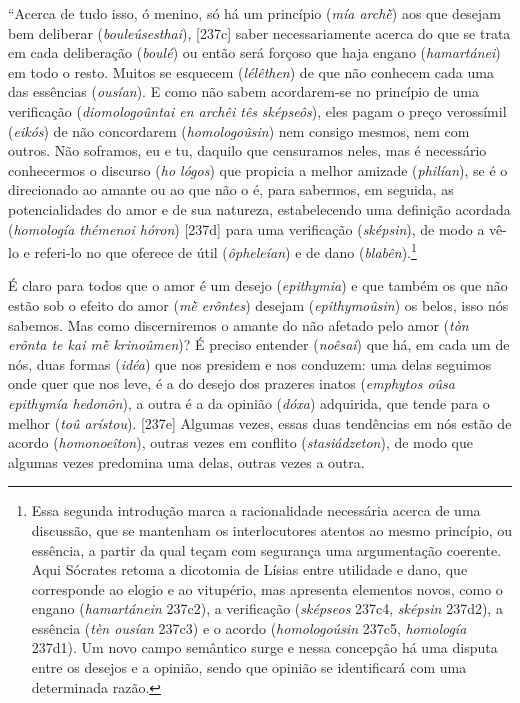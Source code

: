 ``Acerca de tudo isso, ó menino, só há um princípio (\emph{mía archḕ})
aos que desejam bem deliberar (\emph{bouleúsesthai}), {[}237c{]} saber
necessariamente acerca do que se trata em cada deliberação
(\emph{boulé}) ou então será forçoso que haja engano (\emph{hamartánei})
em todo o resto. Muitos se esquecem (\emph{lélêthen}) de que não
conhecem cada uma das essências (\emph{ousían}). E como não sabem
acordarem-se no princípio de uma verificação (\emph{diomologoûntai en
archêi tês} \emph{sképseôs}), eles pagam o preço verossímil
(\emph{eikós}) de não concordarem (\emph{homologoûsin}) nem consigo
mesmos, nem com outros. Não soframos, eu e tu, daquilo que censuramos
neles, mas é necessário conhecermos o discurso (\emph{ho lógos}) que
propicia a melhor amizade (\emph{philían}), se é o direcionado ao amante
ou ao que não o é, para sabermos, em seguida, as potencialidades do amor
e de sua natureza, estabelecendo uma definição acordada (\emph{homología
thémenoi hóron}) {[}237d{]} para uma verificação (\emph{sképsin}), de
modo a vê-lo e referi-lo no que oferece de útil (\emph{ôpheleían}) e de
dano (\emph{blabên}).\footnote{Essa segunda introdução marca a
  racionalidade necessária acerca de uma discussão, que se mantenham os
  interlocutores atentos ao mesmo princípio, ou essência, a partir da
  qual teçam com segurança uma argumentação coerente. Aqui Sócrates
  retoma a dicotomia de Lísias entre utilidade e dano, que corresponde
  ao elogio e ao vitupério, mas apresenta elementos novos, como o engano
  (\emph{hamartánein} 237c2), a verificação (\emph{sképseos} 237c4,
  \emph{sképsin} 237d2), a essência (\emph{tèn ousían} 237c3) e o acordo
  (\emph{homologoúsin} 237c5, \emph{homología} 237d1). Um novo campo
  semântico surge e nessa concepção há uma disputa entre os desejos e a
  opinião, sendo que opinião se identificará com uma determinada razão.}

É claro para todos que o amor é um desejo (\emph{epithymia}) e que
também os que não estão sob o efeito do amor (\emph{mḕ erôntes}) desejam
(\emph{epithymoûsin}) os belos, isso nós sabemos. Mas como discerniremos
o amante do não afetado pelo amor (\emph{tòn erônta te kai mḕ
krinoûmen})? É preciso entender (\emph{noêsai}) que há, em cada um de
nós, duas formas (\emph{idéa}) que nos presidem e nos conduzem: uma
delas seguimos onde quer que nos leve, é a do desejo dos prazeres inatos
(\emph{emphytos oûsa epithymía hedonôn}), a outra é a da opinião
(\emph{dóxa}) adquirida, que tende para o melhor (\emph{toû arístou}).
{[}237e{]} Algumas vezes, essas duas tendências em nós estão de acordo
(\emph{homonoeîton}), outras vezes em conflito (\emph{stasiádzeton}), de
modo que algumas vezes predomina uma delas, outras vezes a outra.

